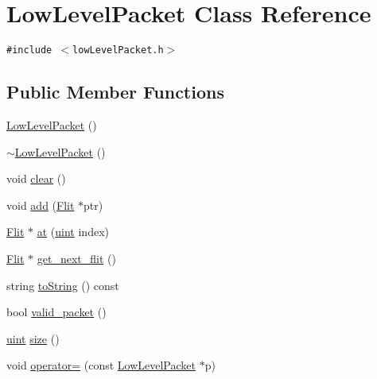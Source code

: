 \hypertarget{classLowLevelPacket}{
\section{LowLevelPacket Class Reference}
\label{classLowLevelPacket}
}
{\tt \#include $<$lowLevelPacket.h$>$}

\subsection*{Public Member Functions}
\begin{CompactItemize}
\item 
\hyperlink{classLowLevelPacket_550561f33ccae00163b40e963121c156}{LowLevelPacket} ()
\item 
\hyperlink{classLowLevelPacket_52d6041c394872c42cd4211e09ca76d4}{$\sim$LowLevelPacket} ()
\item 
void \hyperlink{classLowLevelPacket_726a1d04c62dc4f20de1bcd7bebd031d}{clear} ()
\item 
void \hyperlink{classLowLevelPacket_b2d005a02fb4645db9145f699d330656}{add} (\hyperlink{classFlit}{Flit} $\ast$ptr)
\item 
\hyperlink{classFlit}{Flit} $\ast$ \hyperlink{classLowLevelPacket_01bcea53e1afb4be73ddaa8503e053dc}{at} (\hyperlink{outputBuffer_8h_91ad9478d81a7aaf2593e8d9c3d06a14}{uint} index)
\item 
\hyperlink{classFlit}{Flit} $\ast$ \hyperlink{classLowLevelPacket_508b439358881368b5ef646ef36b4cac}{get\_\-next\_\-flit} ()
\item 
string \hyperlink{classLowLevelPacket_5a52563bae0560cb9b0b9a6d44adde6c}{toString} () const 
\item 
bool \hyperlink{classLowLevelPacket_1053348a061e1878e90a4f49d383889f}{valid\_\-packet} ()
\item 
\hyperlink{outputBuffer_8h_91ad9478d81a7aaf2593e8d9c3d06a14}{uint} \hyperlink{classLowLevelPacket_f61b1051a4dbda237dbeb1bd74220d20}{size} ()
\item 
void \hyperlink{classLowLevelPacket_5a52c8b9499a757227a71ba51f1ef61a}{operator=} (const \hyperlink{classLowLevelPacket}{LowLevelPacket} $\ast$p)
\end{CompactItemize}
